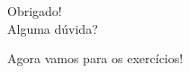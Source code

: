 \documentclass[xcolor=dvipsnames,t,aspectratio=169]{beamer}
\newcommand{\highlight}[1]{{\color{nes_dark_orange} #1}}
\begin{document}
\begin{frame}
    \frametitle{~}
        \vfill
        \begin{center}
            {\Huge Obrigado!}\vspace{1.5em}\\
            {\Large \highlight{Alguma dúvida?}}\\
        \end{center}
        \vfill
        \begin{center}
            {\small Agora vamos para os exercícios!}
        \end{center}
\end{frame}
\end{document}
